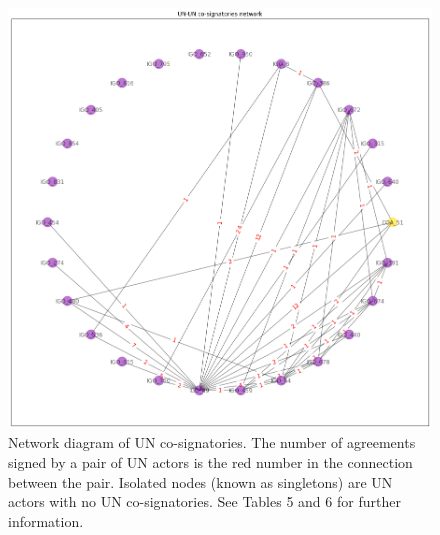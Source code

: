 \documentclass{article}
\begin{document}
\begin{figure}[H]
\begin{center}
\includegraphics[scale=0.38]{./assets/figure_3.png}
\caption{Network diagram of UN co-signatories. The number of agreements signed by a pair of UN actors is the red number in the connection between the pair. Isolated nodes (known as singletons) are UN actors with no UN co-signatories. See Tables 5 and 6 for further information.}
\end{center}
\end{figure}
\end{document}

